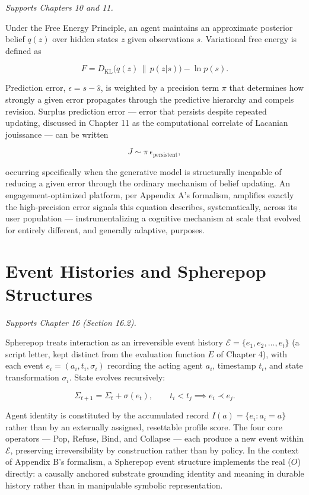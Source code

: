 \documentclass[12pt,a4paper]{book}
\begin{document}
\emph{Supports Chapters 10 and 11.}

Under the Free Energy Principle, an agent maintains an approximate posterior belief $q(z)$ over hidden states $z$ given observations $s$. Variational free energy is defined as

\[
F = D_{\mathrm{KL}}\bigl(q(z) \,\|\, p(z|s)\bigr) - \ln p(s).
\]

Prediction error, $\epsilon = s - \hat{s}$, is weighted by a precision term $\pi$ that determines how strongly a given error propagates through the predictive hierarchy and compels revision. Surplus prediction error — error that persists despite repeated updating, discussed in Chapter 11 as the computational correlate of Lacanian jouissance — can be written

\[
J \sim \pi\, \epsilon_{\mathrm{persistent}},
\]

occurring specifically when the generative model is structurally incapable of reducing a given error through the ordinary mechanism of belief updating. An engagement-optimized platform, per Appendix A's formalism, amplifies exactly the high-precision error signals this equation describes, systematically, across its user population — instrumentalizing a cognitive mechanism at scale that evolved for entirely different, and generally adaptive, purposes.


\chapter{Event Histories and Spherepop Structures}
\label{app:spherepop}

\emph{Supports Chapter 16 (Section 16.2).}

Spherepop treats interaction as an irreversible event history $\mathcal{E} = \{e_1, e_2, \ldots, e_t\}$ (a script letter, kept distinct from the evaluation function $E$ of Chapter 4), with each event $e_i = (a_i, t_i, \sigma_i)$ recording the acting agent $a_i$, timestamp $t_i$, and state transformation $\sigma_i$. State evolves recursively:

\[
\Sigma_{t+1} = \Sigma_t + \sigma(e_t), \qquad t_i < t_j \implies e_i \prec e_j.
\]

Agent identity is constituted by the accumulated record $I(a) = \{e_i : a_i = a\}$ rather than by an externally assigned, resettable profile score. The four core operators — Pop, Refuse, Bind, and Collapse — each produce a new event within $\mathcal{E}$, preserving irreversibility by construction rather than by policy. In the context of Appendix B's formalism, a Spherepop event structure implements the real ($O$) directly: a causally anchored substrate grounding identity and meaning in durable history rather than in manipulable symbolic representation.
\end{document}
